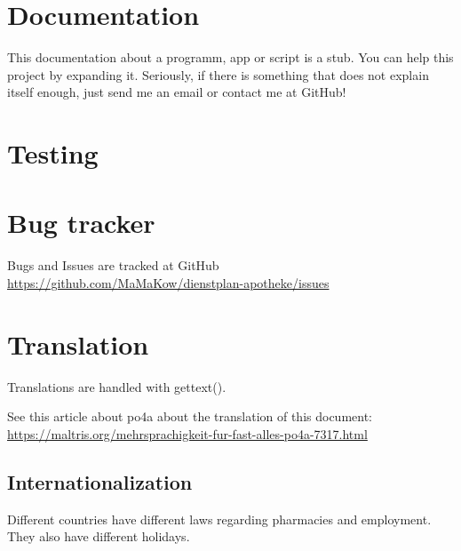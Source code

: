 \section{Documentation}
This documentation about a programm, app or script is a stub. You can help this project by expanding it.
Seriously, if there is something that does not explain itself enough, just send me an email or contact me at GitHub!


\section{Testing}


\section{Bug tracker}
Bugs and Issues are tracked at GitHub \url{https://github.com/MaMaKow/dienstplan-apotheke/issues}


\section{Translation}
Translations are handled with gettext().

See this article about po4a about the translation of this document:
\url{https://maltris.org/mehrsprachigkeit-fur-fast-alles-po4a-7317.html}

\subsection{Internationalization}
Different countries have different laws regarding pharmacies and employment. They also have different holidays.
